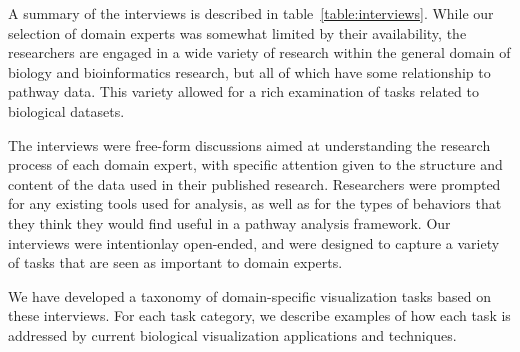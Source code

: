 \documentclass[twocolumn]{bmcart}%
\begin{document}
A summary of the interviews is described in table~\ref{table:interviews}.
While our selection of domain experts was somewhat limited by their availability, the researchers are engaged in a wide variety of research within the general domain of biology and bioinformatics research, but all of which have some relationship to pathway data.
This variety allowed for a rich examination of tasks related to biological datasets.

The interviews were free-form discussions aimed at understanding the research process of each domain expert, with specific attention given to the structure and content of the data used in their published research.
Researchers were prompted for any existing tools used for analysis, as well as for the types of behaviors that they think they would find useful in a pathway analysis framework.
Our interviews were intentionlay open-ended, and were designed to capture a variety of tasks that are seen as important to domain experts.

We have developed a taxonomy of domain-specific visualization tasks based on these interviews. For each task category, we describe examples of how each task is addressed by current biological visualization applications and techniques.
\end{document}
